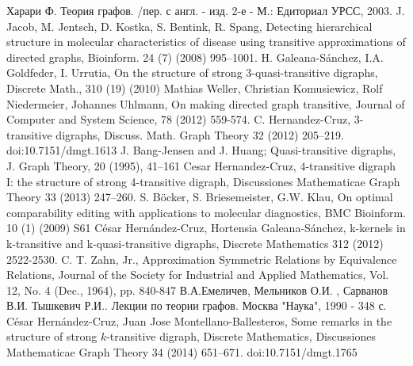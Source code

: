 \documentclass[a4paper,12pt]{article}
\theoremstyle{plain}
\theoremstyle{definition}
\begin{document}
    
        \begin{thebibliography}{10}
         Харари Ф. Теория графов. /пер. с англ. - изд. 2-е - М.: Едиториал УРСС, 2003.
         J. Jacob, M. Jentsch, D. Kostka, S. Bentink, R. Spang, Detecting hierarchical structure in molecular characteristics of disease using transitive approximations of directed graphs, Bioinform. 24 (7) (2008) 995–1001.
         H. Galeana-Sánchez, I.A. Goldfeder, I. Urrutia, On the structure of strong 3-quasi-transitive digraphs, Discrete Math., 310 (19) (2010)
         Mathias Weller, Christian Komusiewicz, Rolf Niedermeier, Johannes Uhlmann, On making directed graph transitive, Journal of Computer and System Science, 78 (2012) 559-574.
         C. Hernandez-Cruz, 3-transitive digraphs, Discuss. Math. Graph Theory 32 (2012) 205–219. doi:10.7151/dmgt.1613
         J. Bang-Jensen and J. Huang; Quasi-transitive digraphs, J. Graph Theory, 20 (1995), 41–161
         Cesar Hernandez-Cruz, 4-transitive digraph I: the structure of strong 4-transitive digraph, Discussiones Mathematicae Graph Theory 33 (2013) 247–260.
         S. Böcker, S. Briesemeister, G.W. Klau, On optimal comparability editing with applications to molecular diagnostics, BMC Bioinform. 10 (1) (2009) S61
         César Hernández-Cruz, Hortensia Galeana-Sánchez, k-kernels in k-transitive and k-quasi-transitive digraphs, Discrete Mathematics 312 (2012) 2522-2530.
         C. T. Zahn, Jr., Approximation Symmetric Relations by Equivalence Relations, Journal of the Society for Industrial and Applied Mathematics, Vol. 12, No. 4 (Dec., 1964), pp. 840-847
         В.А.Емеличев, Мельников О.И. , Сарванов В.И. Тышкевич Р.И.. Лекции по теории графов. Москва "Наука", 1990 - 348 с.
         César Hernández-Cruz, Juan Jose Montellano-Ballesteros, Some remarks in the structure of strong $k$-transitive digraph, Discrete Mathematics, Discussiones Mathematicae Graph Theory 34 (2014) 651–671.  doi:10.7151/dmgt.1765

    \end{thebibliography}
\par
	

	
	
	
	
	
	
	
	
	
	
	
	
	
	
	
	
	
	
	
	
	
	
\end{document}
